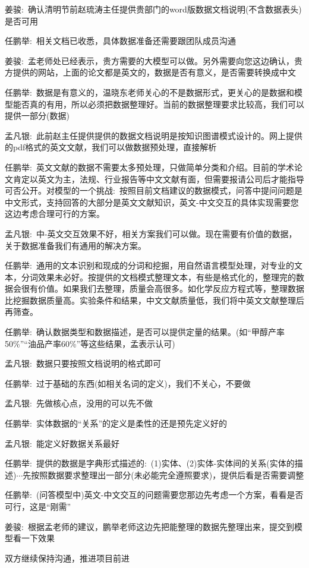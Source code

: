 {姜骏}:~确认清明节前赵琉涛主任提供贵部门的\textrm{word}版数据文档说明(不含数据表头)是否可用

{任鹏举}:~相关文档已收悉，具体数据准备还需要跟团队成员沟通

{姜骏}:~孟老师处已经表示，贵方需要的大模型可以做。另外需要向您这边确认，贵方提供的网站，上面的论文都是英文的，数据是否有意义，是否需要转换成中文

{任鹏举}:~数据是有意义的，温晓东老师关心的不是数据形式，更关心的是数据和模型能否真的有用，所以必须把数据整理好。当前的数据整理要求比较高，我们可以提供一部分(数据)

{孟凡银}:~此前赵主任提供提供的数据文档说明是按知识图谱模式设计的。网上提供的\textrm{pdf}格式的英文文献，我们可以做数据预处理，直接解析

{任鹏举}:~英文文献的数据不需要太多预处理，只做简单分类和介绍。目前的学术论文肯定以英文为主，法规、行业报告等中文文献有面，但需要报请公司后才能指导可否公开。对模型的一个挑战:~按照目前文档建议的数据模式，问答中提问问题是中文形式，支持回答的大部分是英文文献知识，英文-中文交互的具体实现需要您这边考虑合理可行的方案。

{孟凡银}:~中-英文交互效果不好，相关方案我们可以做。现在需要有价值的数据，关于数据准备我们有通用的解决方案。

{任鹏举}:~通用的文本识别和现成的分词和挖掘，用自然语言模型处理，对专业的文本，分词效果未必好。按提供的文档模式整理文本，有些是格式化的，整理完的数据会很有价值。如果我们去整理，质量会高很多。如化学反应方程式等，整理数据比挖掘数据质量高。实验条件和结果，中文文献质量低，我们将中英文文献整理后再筛查。

{任鹏举}:~确认数据类型和数据描述，是否可以提供定量的结果。(如“甲醇产率50\%”“油品产率60\%”等这些结果，孟表示认可)

{孟凡银}:~数据只要按照文档说明的格式即可

{任鹏举}:~过于基础的东西(如相关名词的定义)，我们不关心，不要做

{孟凡银}:~先做核心点，没用的可以先不做

{任鹏举}:~实体数据的“关系”的定义是柔性的还是预先定义好的

{孟凡银}:~能定义好数据关系最好

{任鹏举}:~提供的数据是字典形式描述的:~(1)实体、(2)实体-实体间的关系(实体的描述)$\cdots$先按照数据要求整理出一部分(未必能完全遵照要求)，提供后看是否需要调整

{任鹏举}:~(问答模型中)英文-中文交互的问题需要您那边先考虑一个方案，看看是否可行，这是“刚需”

{姜骏}:~根据孟老师的建议，鹏举老师这边先把能整理的数据先整理出来，提交到模型看一下效果

双方继续保持沟通，推进项目前进
